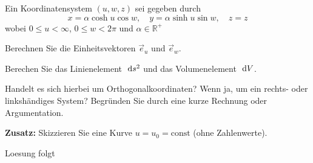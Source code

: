 \documentclass{atistandalonetask}
\begin{document}
  \begin{atiTask}[
    title = Koordinatentransformation
  ]
  Ein Koordinatensystem $(u,w,z)$ sei gegeben durch
  \[
  x=\alpha\cosh u\cos w,\quad y=\alpha \sinh u \sin w,\quad z=z
  \]
  wobei $0\leq u< \infty$, $0\leq w<2\pi$ und $\alpha \in \mathbb{R^+}$
  
 \begin{atiSubtasks}
 \item Berechnen Sie die Einheitsvektoren $\vec{e}_u$ und $\vec{e}_w$. 
 \item Berechen Sie das Linienelement $\;\mathrm{d} s^2$ und das Volumenelement $\;\mathrm{d} V$.
 \item Handelt es sich hierbei um Orthogonalkoordinaten? Wenn ja, um ein rechts- oder linkshändiges System? Begründen Sie durch eine kurze Rechnung oder Argumentation.
 \item \textbf{Zusatz:} Skizzieren Sie eine Kurve $u=u_0=\text{const}$ (ohne Zahlenwerte).
 \end{atiSubtasks}	
  \end{atiTask}
  \begin{atiSolution}
Loesung folgt
  \end{atiSolution}
\end{document}
